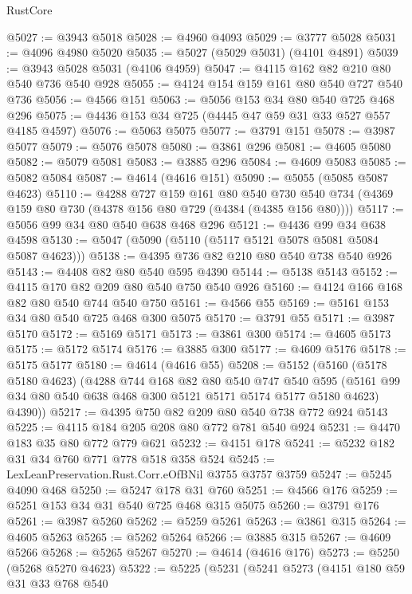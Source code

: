 \begin{lexlean}{RustCore}
\begin{coremodule}
@5027 := @3943 @5018
@5028 := @4960 @4093
@5029 := @3777 @5028
@5031 := @4096 @4980 @5020
@5035 := @5027 (@5029 @5031) (@4101 @4891)
@5039 := @3943 @5028 @5031 (@4106 @4959)
@5047 := @4115 @162 @82 @210 @80 @540 @736 @540 @928
@5055 := @4124 @154 @159 @161 @80 @540 @727 @540 @736
@5056 := @4566 @151
@5063 := @5056 @153 @34 @80 @540 @725 @468 @296
@5075 := @4436 @153 @34 @725 (@4445 @47 @59 @31 @33 @527 @557 @4185 @4597)
@5076 := @5063 @5075
@5077 := @3791 @151
@5078 := @3987 @5077
@5079 := @5076 @5078
@5080 := @3861 @296
@5081 := @4605 @5080
@5082 := @5079 @5081
@5083 := @3885 @296
@5084 := @4609 @5083
@5085 := @5082 @5084
@5087 := @4614 (@4616 @151)
@5090 := @5055 (@5085 @5087 @4623)
@5110 := @4288
    @727
    @159
    @161
    @80
    @540
    @730
    @540
    @734
    (@4369 @159 @80 @730 (@4378 @156 @80 @729 (@4384 (@4385 @156 @80))))
@5117 := @5056 @99 @34 @80 @540 @638 @468 @296
@5121 := @4436 @99 @34 @638 @4598
@5130 := @5047 (@5090 (@5110 (@5117 @5121 @5078 @5081 @5084 @5087 @4623)))
@5138 := @4395 @736 @82 @210 @80 @540 @738 @540 @926
@5143 := @4408 @82 @80 @540 @595 @4390
@5144 := @5138 @5143
@5152 := @4115 @170 @82 @209 @80 @540 @750 @540 @926
@5160 := @4124 @166 @168 @82 @80 @540 @744 @540 @750
@5161 := @4566 @55
@5169 := @5161 @153 @34 @80 @540 @725 @468 @300 @5075
@5170 := @3791 @55
@5171 := @3987 @5170
@5172 := @5169 @5171
@5173 := @3861 @300
@5174 := @4605 @5173
@5175 := @5172 @5174
@5176 := @3885 @300
@5177 := @4609 @5176
@5178 := @5175 @5177
@5180 := @4614 (@4616 @55)
@5208 := @5152
    (@5160
      (@5178 @5180 @4623)
      (@4288
        @744
        @168
        @82
        @80
        @540
        @747
        @540
        @595
        (@5161 @99 @34 @80 @540 @638 @468 @300 @5121 @5171 @5174 @5177 @5180 @4623)
        @4390))
@5217 := @4395 @750 @82 @209 @80 @540 @738 @772 @924 @5143
@5225 := @4115 @184 @205 @208 @80 @772 @781 @540 @924
@5231 := @4470 @183 @35 @80 @772 @779 @621
@5232 := @4151 @178
@5241 := @5232 @182 @31 @34 @760 @771 @778 @518 @358 @524
@5245 := LexLeanPreservation.Rust.Corr.eOfBNil @3755 @3757 @3759
@5247 := @5245 @4090 @468
@5250 := @5247 @178 @31 @760
@5251 := @4566 @176
@5259 := @5251 @153 @34 @31 @540 @725 @468 @315 @5075
@5260 := @3791 @176
@5261 := @3987 @5260
@5262 := @5259 @5261
@5263 := @3861 @315
@5264 := @4605 @5263
@5265 := @5262 @5264
@5266 := @3885 @315
@5267 := @4609 @5266
@5268 := @5265 @5267
@5270 := @4614 (@4616 @176)
@5273 := @5250 (@5268 @5270 @4623)
@5322 := @5225
    (@5231
      (@5241
        @5273
        (@4151
          @180
          @59
          @31
          @33
          @768
          @540

\end{coremodule}
\end{lexlean}
